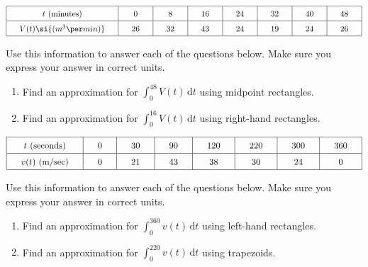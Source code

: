  \begin{align*}
    \arraycolsep=16.5pt\def\arraystretch{1.5}
    \begin{array}{|c|c|c|c|c|c|c|c|}
        \hline
        t \text{ (minutes)} & 0 & 8 & 16 & 24 & 32 & 40 & 48 \\ \hline
        V(t) \si{(m^3 \per min)} & 26 & 32 & 43 & 24 & 19 & 24 & 26 \\
        \hline
    \end{array}
\end{align*}

Use this information to answer each of the questions below. Make sure you express your answer in correct units.
\begin{enumerate}[label=\hspace{11pt}(\alph*), align=left, leftmargin=*, labelsep=0.25em]
    \item Find an approximation for $\int_0^{48} V(t) \,\mathrm{d}t$ using midpoint rectangles. 
    \item Find an approximation for $\int_0^{16} V(t) \,\mathrm{d}t$ using right-hand rectangles. 
\end{enumerate} \vspace{11pt}

 \begin{align*}
    \arraycolsep=16.5pt\def\arraystretch{1.5}
    \begin{array}{|c|c|c|c|c|c|c|c|}
        \hline
        t \text{ (seconds)} & 0 & 30 & 90 & 120 & 220 & 300 & 360 \\ \hline
        v(t) \text{ (m/sec)} & 0 & 21 & 43 & 38 & 30 & 24 & 0 \\
        \hline
    \end{array}
\end{align*}

Use this information to answer each of the questions below. Make sure you express your answer in correct units.
\begin{enumerate}[label=\hspace{11pt}(\alph*), align=left, leftmargin=*, labelsep=0.25em]
    \item Find an approximation for $\int_0^{360} v(t) \,\mathrm{d}t$ using left-hand rectangles. 
    \item Find an approximation for $\int_0^{220} v(t) \,\mathrm{d}t$ using trapezoids. 
\end{enumerate} \vspace{11pt}

